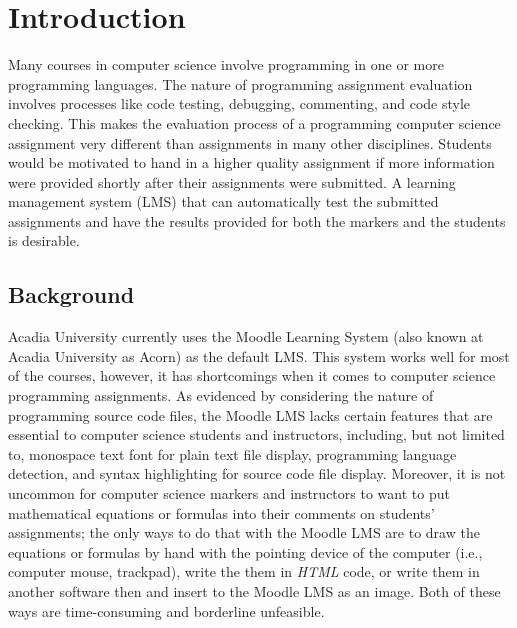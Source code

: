 

\chapter{Introduction}
\label{chap:INTRO}

Many courses in computer science involve programming in one or more programming
languages.
The nature of programming assignment evaluation
involves processes like code testing, debugging, commenting, and code style
checking.
This makes the evaluation process of a programming computer science assignment
very different than assignments in many other disciplines.
Students would be motivated to hand in a higher quality assignment
if more information were provided shortly after their assignments were
submitted.
A learning management system (LMS) that can automatically test the
submitted assignments and have the results provided for both the markers and
the students is desirable.

\section{Background}

Acadia University currently uses the Moodle Learning System (also known at 
Acadia University as Acorn) as the default LMS.
This system works well for most of the courses, however, it has shortcomings
when it comes to computer science programming assignments.
As evidenced by considering the nature of programming source code files,
the Moodle LMS lacks certain features that are essential to computer science
students and instructors,
including, but not limited to, monospace text font for plain text
file display, programming language detection, and syntax
highlighting for source code file display.
Moreover, it is not uncommon for computer science markers and instructors
to want to put mathematical equations or formulas into their comments on
students' assignments; the only ways to do that with the Moodle
LMS are to draw the equations or formulas by hand with the
pointing device of the computer (i.e., computer mouse, trackpad), write
the them in \emph{HTML} code,
or write them in another software then and insert to the Moodle LMS as an image.
Both of these ways are
time-consuming and borderline unfeasible.

\medskip

